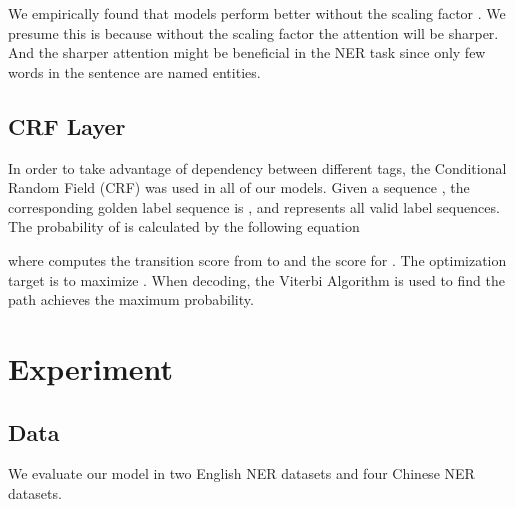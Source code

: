 \documentclass[11pt,a4paper]{article}
\begin{document}
We empirically found that models perform better without the scaling factor . We presume this is because without the scaling factor the attention will be sharper. And the sharper attention might be beneficial in the NER task since only few words in the sentence are named entities.


\subsection{CRF Layer}
In order to take advantage of dependency between different tags, the Conditional Random Field (CRF) was used in all of our models. Given a sequence , the corresponding golden label sequence is , and  represents all valid label sequences. The probability of  is calculated by the following equation

\vspace{-1em}
{\small
}where  computes the transition score from  to  and the score for . The optimization target is to maximize . When decoding, the Viterbi Algorithm is used to find the path achieves the maximum probability.

\section{Experiment}

\subsection{Data}

We evaluate our model in two English NER datasets and four Chinese NER datasets.
\end{document}
